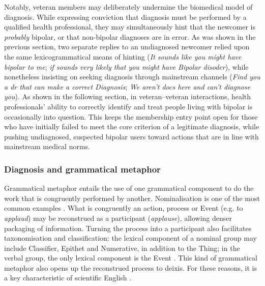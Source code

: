 \documentclass{article}
\renewcommand{\cite}{\parencite}
\begin{document}
Notably, veteran members may deliberately undermine the biomedical model of diagnosis. While expressing conviction that diagnosis must be performed by a qualified health professional, they may simultaneously hint that the newcomer is \emph{probably} bipolar, or that non-bipolar diagnoses are in error. As was shown in the previous section, two separate replies to an undiagnosed newcomer relied upon the same lexicogrammatical means of hinting (\emph{It sounds like you might have bipolar to me}; \emph{if sounds very likely that you might have Bipolar disoder}), while nonetheless insisting on seeking diagnosis through mainstream channels (\emph{Find you a dr that can make a correct Diagnosis}; \emph{We aren't docs here and can't diagnose you}). As shown in the following section, in veteran--veteran interactions, health professionals' ability to correctly identify and treat people living with bipolar is occasionally into question. This keeps the membership entry point open for those who have initially failed to meet the core criterion of a legitimate diagnosis, while pushing undiagnosed, suspected bipolar users toward actions that are in line with mainstream medical norms. %

\subsubsection{Diagnosis and grammatical metaphor}

Grammatical metaphor entails the use of one grammatical component to do the work that is congruently performed by another. Nominalisation is one of the most common examples \cite{simon-vandenbergen_grammatical_2003}. What is congruently an action, process or Event (e.g. to \emph{applaud}) may be reconstrued as a participant (\emph{applause}), allowing denser packaging of information. Turning the process into a participant also facilitates taxonomisation and classification: the lexical component of a nominal group may include Classifier, Epithet and Numerative, in addition to the Thing; in the verbal group, the only lexical component is the Event \cite{halliday_introduction_2004}. This kind of grammatical metaphor also opens up the reconstrued process to deixis. For these reasons, it is a key characteristic of scientific English \cite{halliday1999construing}. 
\end{document}
